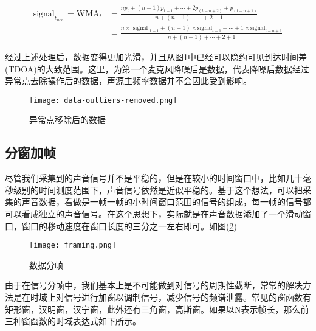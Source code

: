\documentclass[winfonts,oneside]{njuthesis}
\begin{document}
			\begin{equation}
			\begin{aligned}
				\text{signal}_{t_{new}} = \text{WMA}_{t}&=\frac{n p_{t}+(n-1) p_{t-1}+\cdots+2 p_{(t-n+2)}+p_{(t-n+1)}}{n+(n-1)+\cdots+2+1}\\
											  &=\frac{n \times \text { signal }_{t-1}+(n-1) \times \text {signal}_{t-1}+\cdots+1 \times \text {signal}_{t-n+1}}{n+(n-1)+\cdots+2+1}								 
			\end{aligned}
			\end{equation}
			
			经过上述处理后，数据变得更加光滑，并且从图\ref{fig: data-outliers-removed}中已经可以隐约可见到达时间差(TDOA)的大致范围。这里，为第一个麦克风降噪后是数据，代表降噪后数据经过异常点去除操作后的数据，声源主频率数据并不会因此受到影响。
			
			\begin{figure}[H]
				\centering
				\texttt{[image: data-outliers-removed.png]} 
				\caption{异常点移除后的数据}
				\label{fig: data-outliers-removed}
			\end{figure}
		
		\subsection{分窗加帧}
		
			尽管我们采集到的声音信号并不是平稳的，但是在较小的时间窗口中，比如几十毫秒级别的时间测度范围下，声音信号依然是近似平稳的。基于这个想法，可以把采集的声音数据，看做是一帧一帧的小时间窗口范围的信号的组成，每一帧的信号都可以看成独立的声音信号。在这个思想下，实际就是在声音数据添加了一个滑动窗口，窗口的移动速度在窗口长度的三分之一左右即可。如图(\ref{fig: framing})
					
			\begin{figure}[H]
				\centering
				\texttt{[image: framing.png]} 
				\caption{数据分帧}
				\label{fig: framing}
			\end{figure}
		
			由于在信号分帧中，我们基本上是不可能做到对信号的周期性截断，常常的解决方法是在时域上对信号进行加窗以调制信号，减少信号的频谱泄露。常见的窗函数有矩形窗，汉明窗，汉宁窗，此外还有三角窗，高斯窗\cite{Window_function}。如果以N表示帧长，那么前三种窗函数的时域表达式如下所示。
			
\end{document}
